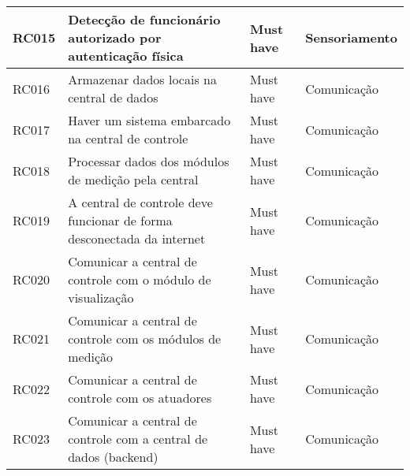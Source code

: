 \begin{table}[H]
\begin{adjustbox}{max width = \textwidth}
\begin{tabular}{|L{1.5cm}|L{8.5cm}|C{2.5cm}|C{3.5cm}|}
        RC015 & Detecção de funcionário autorizado por autenticação física & Must have & Sensoriamento \\ \hline
        RC016 & Armazenar dados locais na central de dados & Must have & Comunicação\\ \hline
        RC017 & Haver um sistema embarcado na central de controle & Must have & Comunicação\\ \hline
        RC018 & Processar dados dos módulos de medição  pela central & Must have & Comunicação\\ \hline
        RC019 & A central de controle deve funcionar de forma desconectada da internet & Must have & Comunicação\\ \hline
        RC020 & Comunicar a central de controle  com o módulo de visualização & Must have & Comunicação\\ \hline
        RC021 & Comunicar a central de controle com os módulos de medição & Must have & Comunicação\\ \hline
        RC022 & Comunicar a central de controle com os atuadores & Must have & Comunicação\\ \hline
        RC023 & Comunicar a  central de controle com a central de dados (backend) & Must have & Comunicação\\ \hline
        \end{tabular}
	\end{adjustbox}    
\end{table}


